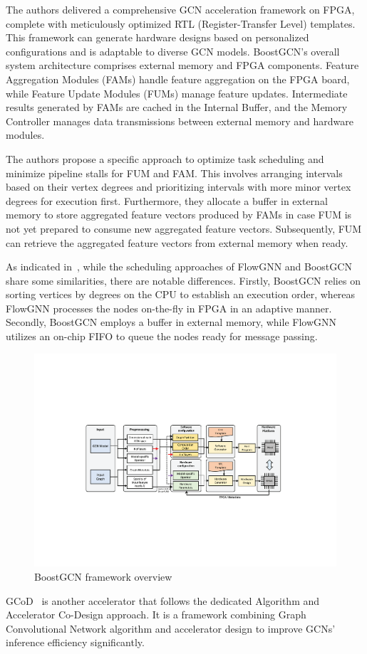 The authors delivered a comprehensive GCN acceleration framework on FPGA, complete with meticulously optimized RTL (Register-Transfer Level) templates.
This framework can generate hardware designs based on personalized configurations and is adaptable to diverse GCN models.
BoostGCN's overall system architecture comprises external memory and FPGA components.
Feature Aggregation Modules (FAMs) handle feature aggregation on the FPGA board, while Feature Update Modules (FUMs) manage feature updates.
Intermediate results generated by FAMs are cached in the Internal Buffer, and the Memory Controller manages data transmissions between external memory and hardware modules.

The authors propose a specific approach to optimize task scheduling and minimize pipeline stalls for FUM and FAM. This involves arranging intervals based on their vertex degrees and prioritizing intervals with more minor vertex degrees for execution first.
Furthermore, they allocate a buffer in external memory to store aggregated feature vectors produced by FAMs in case FUM is not yet prepared to consume new aggregated feature vectors.
Subsequently, FUM can retrieve the aggregated feature vectors from external memory when ready.

As indicated in~\cite{sarkar2022flowgnn}, while the scheduling approaches of FlowGNN and BoostGCN share some similarities, there are notable differences.
Firstly, BoostGCN relies on sorting vertices by degrees on the CPU to establish an execution order, whereas FlowGNN processes the nodes on-the-fly in FPGA in an adaptive manner.
Secondly, BoostGCN employs a buffer in external memory, while FlowGNN utilizes an on-chip FIFO to queue the nodes ready for message passing.

\begin{figure}[t]
    \centering
    \includegraphics[height=0.28\textwidth]{Images/BoostGCN_Framework}
    \caption{BoostGCN framework overview~\cite{9444065}}
    \label{fig:boost-gcn-framework}
\end{figure}

GCoD~\cite{9773223} is another accelerator that follows the dedicated Algorithm and Accelerator Co-Design approach.
It is a framework combining Graph Convolutional Network algorithm and accelerator design to improve GCNs' inference efficiency significantly.

